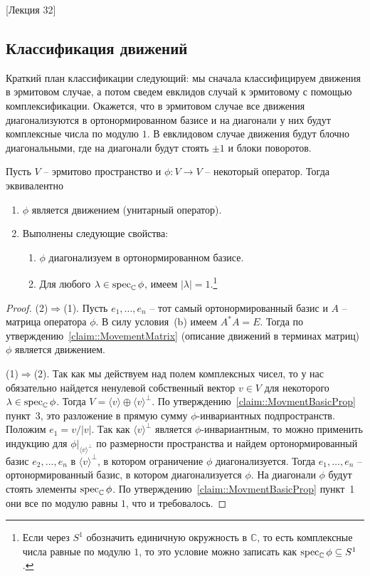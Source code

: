 [Лекция 32]

\subsection{Классификация движений}

Краткий план классификации следующий: мы сначала классифицируем движения в эрмитовом случае, а потом сведем евклидов случай к эрмитовому с помощью комплексификации. Окажется, что в эрмитовом случае все движения диагонализуются в ортонормированном базисе и на диагонали у них будут комплексные числа по модулю $1$. В евклидовом случае движения будут блочно диагональными, где на диагонали будут стоять $\pm1$ и блоки поворотов.

\begin{claim}\label{claim::HermMoveClassific}
Пусть $V$ -- эрмитово пространство и $\phi\colon V\to V$ -- некоторый оператор. Тогда эквивалентно
\begin{enumerate}
\item $\phi$ является движением (унитарный оператор).
\item Выполнены следующие свойства:
\begin{enumerate}
\item $\phi$ диагонализуем в ортонормированном базисе.
\item Для любого $\lambda\in\operatorname{spec}_\mathbb C\phi$, имеем $|\lambda| = 1$.\footnote{Если через $S^1$ обозначить единичную окружность в $\mathbb C$, то есть комплексные числа равные по модулю $1$, то это условие можно записать как $\operatorname{spec}_\mathbb C\phi \subseteq S^1$.}
\end{enumerate}
\end{enumerate}
\end{claim}
\begin{proof}
(2)$\Rightarrow$(1). Пусть $e_1,\ldots,e_n$ -- тот самый ортонормированный базис и $A$ -- матрица оператора $\phi$. В силу условия~(b) имеем $A^*A = E$. Тогда по утверждению~\ref{claim::MovementMatrix} (описание движений в терминах матриц) $\phi$ является движением.

(1)$\Rightarrow$(2). Так как мы действуем над полем комплексных чисел, то у нас обязательно найдется ненулевой собственный вектор $v\in V$ для некоторого $\lambda\in\operatorname{spec}_\mathbb C\phi$. Тогда $V = \langle v\rangle \oplus \langle v\rangle^\bot$. По утверждению~\ref{claim::MovmentBasicProp} пункт~3, это разложение в прямую сумму $\phi$-инвариантных подпространств. Положим $e_1 = v/|v|$. Так как $\langle v\rangle^\bot$ является $\phi$-инвариантным, то можно применить индукцию для $\phi|_{\langle v \rangle^\bot}$  по размерности пространства и найдем ортонормированный базис $e_2,\ldots,e_n$ в $\langle v\rangle^\bot$, в котором ограничение $\phi$ диагонализуется. Тогда $e_1,\ldots,e_n$ -- ортонормированный базис, в котором диагонализуется $\phi$. На диагонали $\phi$ будут стоять элементы $\operatorname{spec}_\mathbb C\phi$. По утверждению~\ref{claim::MovmentBasicProp} пункт~1 они все по модулю равны $1$, что и требовалось.
\end{proof}

